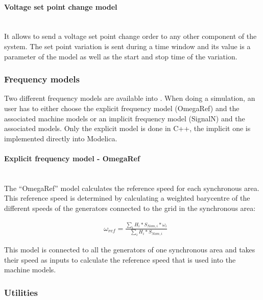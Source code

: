 \documentclass[a4paper, 12pt]{report}
\begin{document}
\paragraph{Voltage set point change model}
~~\\

It allows to send a voltage set point change order to any other component of the system. The set point variation is sent during a time window and its value is a parameter of the model as well as the start and stop time of the variation.

\subsubsection{Frequency models}
\label{Frequency}

Two different frequency models are available into \Dynawo. When doing a simulation, an user has to either choose the explicit frequency model (OmegaRef) and the associated machine models or an implicit frequency model (SignalN) and the associated models. Only the explicit model is done in C++, the implicit one is implemented directly into Modelica.

\paragraph{Explicit frequency model - OmegaRef}
~~\\

The ``OmegaRef'' model calculates the reference speed for each synchronous area. This reference speed is determined by calculating a weighted barycentre of the different speeds of the generators connected to the grid in the synchronous area:

\begin{equation}
\begin{aligned}
& \omega_{ref} = \frac{\sum\limits_{i} H_i * S_{Nom, i} * \omega_{i}}{\sum\limits_{i} H_i * S_{Nom, i}}
\end{aligned}
\label{Speed reference calculation}
\end{equation}

This model is connected to all the generators of one synchronous area and takes their speed as inputs to calculate the reference speed that is used into the machine models.

\subsubsection{Utilities}
\label{Utilities}
\end{document}
